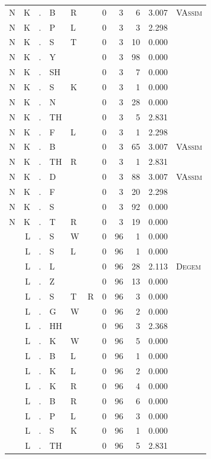 \documentclass[12pt]{article}
\begin{document}
\begin{longtable}{r@{ } r@{ } c@{ } l@{ } l@{ } l@{ } r r r r l }
N & K & . & B & R &  & 0 & 3 & 6 & 3.007 & \textsc{VAssim} \\
N & K & . & P & L &  & 0 & 3 & 3 & 2.298 &  \\
N & K & . & S & T &  & 0 & 3 & 10 & 0.000 &  \\
N & K & . & Y &  &  & 0 & 3 & 98 & 0.000 &  \\
N & K & . & SH &  &  & 0 & 3 & 7 & 0.000 &  \\
N & K & . & S & K &  & 0 & 3 & 1 & 0.000 &  \\
N & K & . & N &  &  & 0 & 3 & 28 & 0.000 &  \\
N & K & . & TH &  &  & 0 & 3 & 5 & 2.831 &  \\
N & K & . & F & L &  & 0 & 3 & 1 & 2.298 &  \\
N & K & . & B &  &  & 0 & 3 & 65 & 3.007 & \textsc{VAssim} \\
N & K & . & TH & R &  & 0 & 3 & 1 & 2.831 &  \\
N & K & . & D &  &  & 0 & 3 & 88 & 3.007 & \textsc{VAssim} \\
N & K & . & F &  &  & 0 & 3 & 20 & 2.298 &  \\
N & K & . & S &  &  & 0 & 3 & 92 & 0.000 &  \\
N & K & . & T & R &  & 0 & 3 & 19 & 0.000 &  \\
 & L & . & S & W &  & 0 & 96 & 1 & 0.000 &  \\
 & L & . & S & L &  & 0 & 96 & 1 & 0.000 &  \\
 & L & . & L &  &  & 0 & 96 & 28 & 2.113 & \textsc{Degem} \\
 & L & . & Z &  &  & 0 & 96 & 13 & 0.000 &  \\
 & L & . & S & T & R & 0 & 96 & 3 & 0.000 &  \\
 & L & . & G & W &  & 0 & 96 & 2 & 0.000 &  \\
 & L & . & HH &  &  & 0 & 96 & 3 & 2.368 &  \\
 & L & . & K & W &  & 0 & 96 & 5 & 0.000 &  \\
 & L & . & B & L &  & 0 & 96 & 1 & 0.000 &  \\
 & L & . & K & L &  & 0 & 96 & 2 & 0.000 &  \\
 & L & . & K & R &  & 0 & 96 & 4 & 0.000 &  \\
 & L & . & B & R &  & 0 & 96 & 6 & 0.000 &  \\
 & L & . & P & L &  & 0 & 96 & 3 & 0.000 &  \\
 & L & . & S & K &  & 0 & 96 & 1 & 0.000 &  \\
 & L & . & TH &  &  & 0 & 96 & 5 & 2.831 &  \\

\end{longtable}
\end{document}
